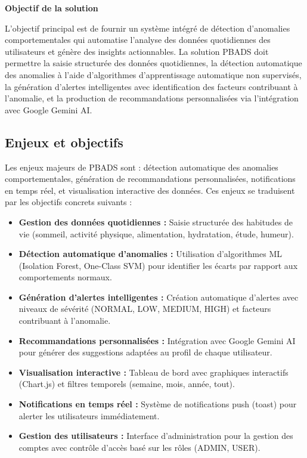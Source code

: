 \textbf{Objectif de la solution}

L'objectif principal est de fournir un système intégré de détection d'anomalies comportementales qui automatise l'analyse des données quotidiennes des utilisateurs et génère des insights actionnables. La solution PBADS doit permettre la saisie structurée des données quotidiennes, la détection automatique des anomalies à l'aide d'algorithmes d'apprentissage automatique non supervisés, la génération d'alertes intelligentes avec identification des facteurs contribuant à l'anomalie, et la production de recommandations personnalisées via l'intégration avec Google Gemini AI.

\subsection{Enjeux et objectifs}

Les enjeux majeurs de PBADS sont : détection automatique des anomalies comportementales, génération de recommandations personnalisées, notifications en temps réel, et visualisation interactive des données. Ces enjeux se traduisent par les objectifs concrets suivants :

\begin{itemize}
    \item \textbf{Gestion des données quotidiennes :} Saisie structurée des habitudes de vie (sommeil, activité physique, alimentation, hydratation, étude, humeur).
    \item \textbf{Détection automatique d'anomalies :} Utilisation d'algorithmes ML (Isolation Forest, One-Class SVM) pour identifier les écarts par rapport aux comportements normaux.
    \item \textbf{Génération d'alertes intelligentes :} Création automatique d'alertes avec niveaux de sévérité (NORMAL, LOW, MEDIUM, HIGH) et facteurs contribuant à l'anomalie.
    \item \textbf{Recommandations personnalisées :} Intégration avec Google Gemini AI pour générer des suggestions adaptées au profil de chaque utilisateur.
    \item \textbf{Visualisation interactive :} Tableau de bord avec graphiques interactifs (Chart.js) et filtres temporels (semaine, mois, année, tout).
    \item \textbf{Notifications en temps réel :} Système de notifications push (toast) pour alerter les utilisateurs immédiatement.
    \item \textbf{Gestion des utilisateurs :} Interface d'administration pour la gestion des comptes avec contrôle d'accès basé sur les rôles (ADMIN, USER).
\end{itemize}

